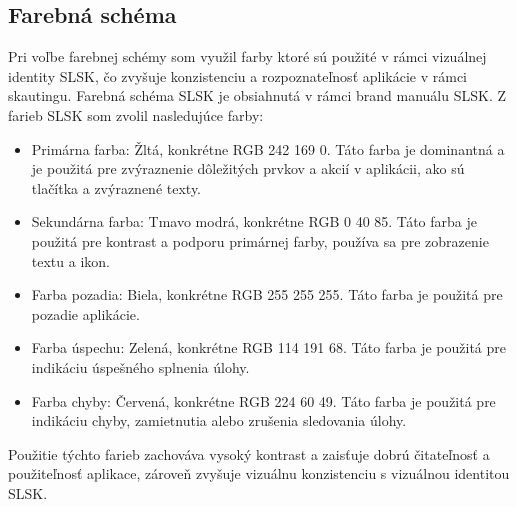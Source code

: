 \subsection{Farebná schéma}
Pri voľbe farebnej schémy som využil farby ktoré sú použité v rámci vizuálnej identity SLSK, čo zvyšuje konzistenciu a rozpoznateľnosť aplikácie v rámci skautingu. Farebná schéma SLSK je obsiahnutá v rámci brand manuálu SLSK. \cite{brand_manual} Z farieb SLSK som zvolil nasledujúce farby:
\begin{itemize}
    \item Primárna farba: Žltá, konkrétne RGB 242 169 0. Táto farba je dominantná a je použitá pre zvýraznenie dôležitých prvkov a akcií v aplikácii, ako sú tlačítka a zvýraznené texty.
    \item Sekundárna farba: Tmavo modrá, konkrétne RGB 0 40 85. Táto farba je použitá pre kontrast a podporu primárnej farby, používa sa pre zobrazenie textu a ikon.
    \item Farba pozadia: Biela, konkrétne RGB 255 255 255. Táto farba je použitá pre pozadie aplikácie.
    \item Farba úspechu: Zelená, konkrétne RGB 114 191 68. Táto farba je použitá pre indikáciu úspešného splnenia úlohy.
    \item Farba chyby: Červená, konkrétne RGB 224 60 49. Táto farba je použitá pre indikáciu chyby, zamietnutia alebo zrušenia sledovania úlohy.
\end{itemize}
Použitie týchto farieb zachováva vysoký kontrast a zaisťuje dobrú čitateľnosť a použiteľnosť aplikace, zároveň zvyšuje vizuálnu konzistenciu s vizuálnou identitou SLSK.

